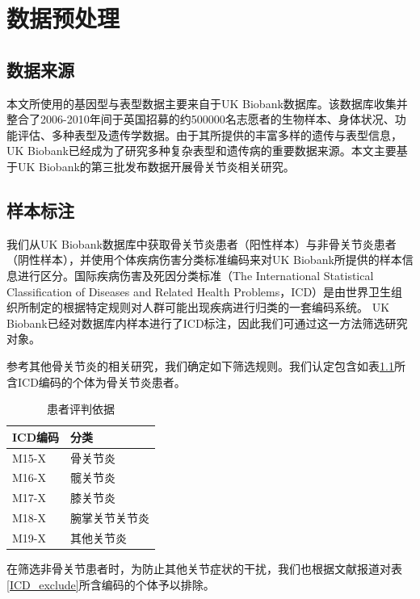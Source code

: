 \chapter{数据预处理}
\section{数据来源}

本文所使用的基因型与表型数据主要来自于UK Biobank\cite{sudlow_uk_2015}数据库。该数据库收集并整合了2006-2010年间于英国招募的约500000名志愿者的生物样本、身体状况、功能评估、多种表型及遗传学数据。由于其所提供的丰富多样的遗传与表型信息，UK Biobank已经成为了研究多种复杂表型和遗传病的重要数据来源。本文主要基于UK Biobank的第三批发布数据开展骨关节炎相关研究。

\section{样本标注}

我们从UK Biobank数据库中获取骨关节炎患者（阳性样本）与非骨关节炎患者（阴性样本），并使用个体疾病伤害分类标准编码来对UK Biobank所提供的样本信息进行区分。国际疾病伤害及死因分类标准（The International Statistical Classification of Diseases and Related Health Problems，ICD）是由世界卫生组织所制定的根据特定规则对人群可能出现疾病进行归类的一套编码系统。\cite{who} UK Biobank已经对数据库内样本进行了ICD标注，因此我们可通过这一方法筛选研究对象。

参考其他骨关节炎的相关研究，\cite{zengini_genome-wide_2018}我们确定如下筛选规则。我们认定包含如表\ref{ICD_include}所含ICD编码的个体为骨关节炎患者。


\begin{table}[!h]
	\renewcommand{\arraystretch}{1.2}
	\centering\wuhao
	\caption{患者评判依据} \label{ICD_include} \vspace{2mm}
	\begin{tabularx}{\textwidth} { 
   >{\centering\arraybackslash}X 
   >{\centering\arraybackslash}X  }
	\toprule[1.5pt]
		ICD编码 & 分类 \\
	\midrule[1pt]
		M15-X & 骨关节炎 \\
        M16-X & 髋关节炎 \\
        M17-X & 膝关节炎 \\
        M18-X & 腕掌关节关节炎 \\
        M19-X & 其他关节炎 \\
	\bottomrule[1.5pt]
	\end{tabularx}
\end{table}
在筛选非骨关节患者时，为防止其他关节症状的干扰，我们也根据文献报道对表\ref{ICD_exclude}所含编码的个体予以排除。

